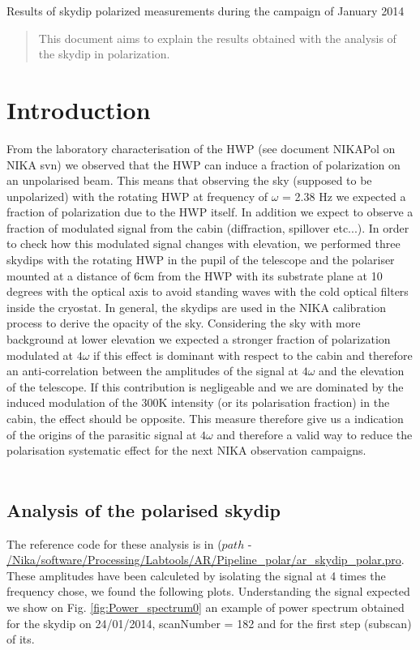 \documentclass[10pt,english]{article}
\begin{document}
\begin{center}
\huge{Results of skydip polarized measurements during the campaign of January 2014}
\end{center}

\vspace{1cm}
\begin{abstract}
This document aims to explain the results obtained with the analysis of the skydip in polarization. 
\end{abstract}

\section{Introduction}
From the laboratory characterisation of the HWP (see document NIKAPol on NIKA svn) we observed that the HWP can induce a fraction of polarization on an unpolarised beam. This means that observing the sky (supposed to be unpolarized) with the rotating HWP at frequency of $\omega$ = 2.38 Hz we expected a fraction  of polarization due to the HWP itself. In addition we expect to observe a fraction of modulated signal from the cabin (diffraction, spillover etc...).
In order to check how this modulated signal changes with elevation, we performed three skydips with the rotating HWP in the pupil of the telescope and the polariser mounted at a distance of 6cm from the HWP with its substrate plane at 10 degrees with the optical axis to avoid standing waves with the cold optical filters inside the cryostat.
In general, the skydips are used in the NIKA calibration process to derive the opacity of the sky. Considering the sky with more background at lower elevation we expected a stronger fraction of polarization modulated at $4\omega$ if this effect is dominant with respect to the cabin and therefore an anti-correlation between the amplitudes of the signal at $4\omega$ and the elevation of the telescope. If this contribution is negligeable and we are dominated by the induced modulation of the 300K intensity (or its polarisation fraction) in the cabin, the effect should be opposite.  This measure therefore give us a indication of the origins of the parasitic signal at $4\omega$ and therefore a valid way to reduce the polarisation systematic effect for the next NIKA observation campaigns.
\\
\\
\subsection{Analysis of the polarised skydip}
The reference code for these analysis is in ($path$ - \url{/Nika/software/Processing/Labtools/AR/Pipeline_polar/ar_skydip_polar.pro}.
These amplitudes have been calculeted by isolating the signal at 4 times the frequency chose, we found the following plots.
Understanding the signal expected we show on Fig. \ref{fig:Power_spectrum0} an example of power spectrum obtained for the skydip on 24/01/2014, scanNumber = 182 and for the first step (subscan) of its.
\end{document}
